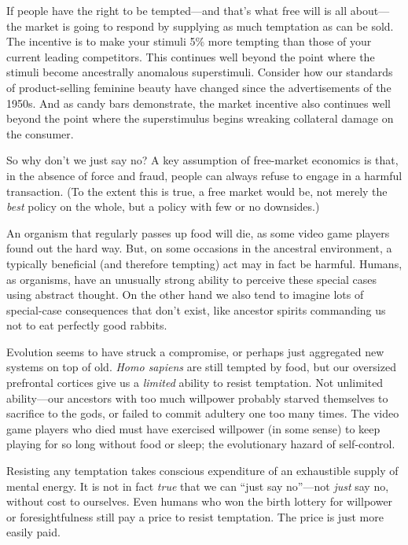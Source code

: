 {{
 If people have the right to be tempted---and
that's what free will is all about---the market is
going to respond by supplying as much temptation as can be sold. The
incentive is to make your stimuli 5\% more tempting than those of your
current leading competitors. This continues well beyond the point where
the stimuli become ancestrally anomalous superstimuli. Consider how our
standards of product-selling feminine beauty have changed since the
advertisements of the 1950s. And as candy bars demonstrate, the market
incentive also continues well beyond the point where the superstimulus
begins wreaking collateral damage on the consumer.}

{
 So why don't we just say no? A key assumption of
free-market economics is that, in the absence of force and fraud,
people can always refuse to engage in a harmful transaction. (To the
extent this is true, a free market would be, not merely the
\textit{best} policy on the whole, but a policy with few or no
downsides.)}

{
 An organism that regularly passes up food will die, as some video
game players found out the hard way. But, on some occasions in the
ancestral environment, a typically beneficial (and therefore tempting)
act may in fact be harmful. Humans, as organisms, have an unusually
strong ability to perceive these special cases using abstract thought.
On the other hand we also tend to imagine lots of special-case
consequences that don't exist, like ancestor spirits
commanding us not to eat perfectly good rabbits.}

{
 Evolution seems to have struck a compromise, or perhaps just
aggregated new systems on top of old. \textit{Homo sapiens} are still
tempted by food, but our oversized prefrontal cortices give us a
\textit{limited} ability to resist temptation. Not unlimited
ability---our ancestors with too much willpower probably starved
themselves to sacrifice to the gods, or failed to commit adultery one
too many times. The video game players who died must have exercised
willpower (in some sense) to keep playing for so long without food or
sleep; the evolutionary hazard of self-control.}

{
 Resisting any temptation takes conscious expenditure of an
exhaustible supply of mental energy. It is not in fact \textit{true}
that we can ``just say no''---not
\textit{just} say no, without cost to ourselves. Even humans who won
the birth lottery for willpower or foresightfulness still pay a price
to resist temptation. The price is just more easily paid.}

}
